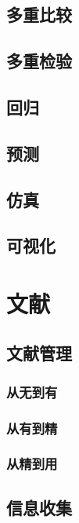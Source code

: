 \documentclass[]{book}
\begin{document}
\section{多重比较}

\section{多重检验}

\section{回归}

\section{预测}

\section{仿真}

\section{可视化}

\chapter{文献}

\section{文献管理}

\subsection{从无到有}

\subsection{从有到精}

\subsection{从精到用}

\section{信息收集}
\end{document}

